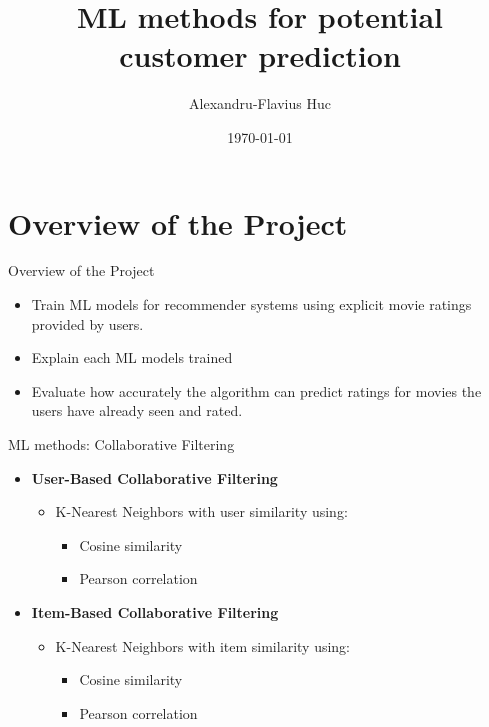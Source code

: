 \documentclass{beamer}
\title{ML methods for potential customer prediction}
\author{Alexandru-Flavius Huc}
\date{\today}
\begin{document}
\begin{frame}
    \titlepage
\end{frame}

\section{Overview of the Project}
\begin{frame}{Overview of the Project}
    \begin{itemize}
        \item Train ML models for recommender systems using explicit movie ratings provided by users.
        \item Explain each ML models trained
        \item Evaluate how accurately the algorithm can predict ratings for movies the users have already seen and rated.
    \end{itemize}
\end{frame}

\begin{frame}{ML methods: Collaborative Filtering}
    \begin{itemize}
        \item \textbf{User-Based Collaborative Filtering}
        \begin{itemize}
            \item K-Nearest Neighbors with user similarity using:
            \begin{itemize}
                \item Cosine similarity
                \item Pearson correlation
            \end{itemize}
        \end{itemize}
        \item \textbf{Item-Based Collaborative Filtering}
            \begin{itemize}
                \item K-Nearest Neighbors with item similarity using:
                \begin{itemize}
                    \item Cosine similarity
                    \item Pearson correlation
                \end{itemize}            
            \end{itemize}
    \end{itemize}
\end{frame}
\end{document}
